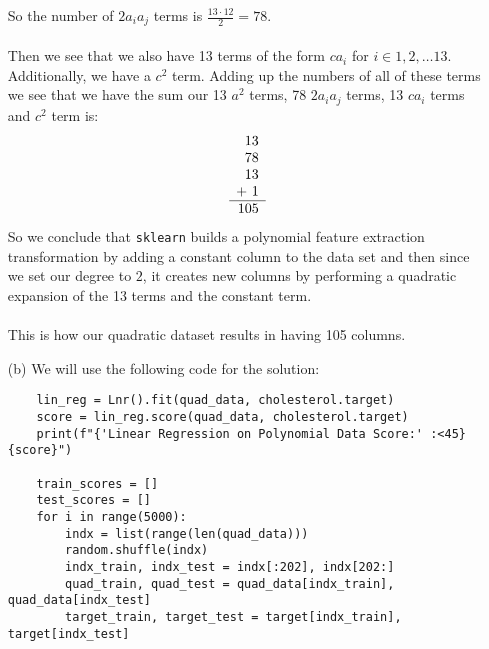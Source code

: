 \documentclass[12pt, letterpaper]{article}
\begin{document}
\begin{enumerate}
    So the number of $2a_ia_j$ terms is $\frac{13 \cdot 12}{2} = 78$. \\ \\
    Then we see that we also have 13 terms of the form $ca_i$ for $i\in {1,2,\dots 13}$. Additionally, 
    we have a $c^2$ term. Adding up the numbers of all of these terms we see that we have the sum our 13 $a^2$ terms, 
    78 $2a_ia_j$ terms, 13 $ca_i$ terms and $c^2$ term is:
    \[
        \begin{array}[t]{r}
            13 \\
            78 \\
            13 \\
        + \  1 \\ \hline
           105
        \end{array}
    \]
    So we conclude that \texttt{sklearn} builds a polynomial feature extraction transformation by adding
    a constant column to the data set and then since we set our degree to $2$, it creates new columns 
    by performing a quadratic expansion of the 13 terms and the constant term. \\ \\
    This is how our quadratic dataset results in having 105 columns.

    \newpage
    \item [(b)] We will use the following code for the solution:
\begin{lstlisting}
    lin_reg = Lnr().fit(quad_data, cholesterol.target)
    score = lin_reg.score(quad_data, cholesterol.target)
    print(f"{'Linear Regression on Polynomial Data Score:' :<45}{score}")
    
    train_scores = []
    test_scores = []
    for i in range(5000):
        indx = list(range(len(quad_data)))
        random.shuffle(indx)
        indx_train, indx_test = indx[:202], indx[202:]
        quad_train, quad_test = quad_data[indx_train], quad_data[indx_test]
        target_train, target_test = target[indx_train], target[indx_test]
    

\end{lstlisting}
\end{enumerate}
\end{document}
